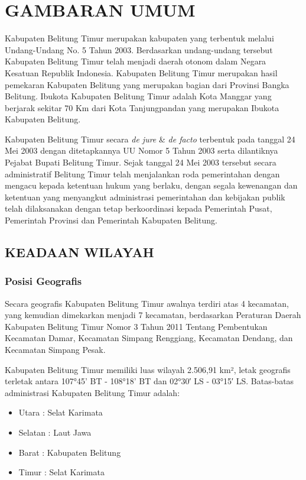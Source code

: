 \chapter{GAMBARAN UMUM}
Kabupaten Belitung Timur merupakan kabupaten yang terbentuk melalui Undang-Undang No. 5 Tahun 2003. Berdasarkan undang-undang tersebut Kabupaten Belitung Timur telah menjadi daerah otonom dalam Negara Kesatuan Republik Indonesia. Kabupaten Belitung Timur merupakan hasil pemekaran Kabupaten Belitung yang merupakan bagian dari Provinsi Bangka Belitung. Ibukota Kabupaten Belitung Timur adalah Kota Manggar yang berjarak sekitar 70 Km dari Kota Tanjungpandan yang merupakan Ibukota Kabupaten Belitung.

Kabupaten Belitung Timur secara \emph{de jure} \& \emph{de facto} terbentuk pada tanggal 24
Mei 2003 dengan ditetapkannya UU Nomor 5 Tahun 2003 serta dilantiknya
Pejabat Bupati Belitung Timur. Sejak tanggal 24 Mei 2003 tersebut
secara administratif Belitung Timur telah menjalankan roda pemerintahan
dengan mengacu kepada ketentuan hukum yang berlaku, dengan segala
kewenangan dan ketentuan yang menyangkut administrasi pemerintahan
dan kebijakan publik telah dilaksanakan dengan tetap berkoordinasi
kepada Pemerintah Pusat, Pemerintah Provinsi dan Pemerintah Kabupaten
Belitung.

\section{KEADAAN WILAYAH}

\subsection{Posisi Geografis}

Secara geografis Kabupaten Belitung Timur awalnya terdiri atas 4 kecamatan,
yang kemudian dimekarkan menjadi 7 kecamatan, berdasarkan Peraturan
Daerah Kabupaten Belitung Timur Nomor 3 Tahun 2011 Tentang Pembentukan
Kecamatan Damar, Kecamatan Simpang Renggiang, Kecamatan Dendang, dan
Kecamatan Simpang Pesak.

Kabupaten Belitung Timur memiliki luas wilayah 2.506,91 km², letak
geografis terletak antara 107°45' BT - 108°18' BT dan 02°30′ LS -
03°15′ LS. Batas-batas administrasi Kabupaten Belitung Timur adalah:
\begin{itemize}
	\item Utara : Selat Karimata
	\item Selatan : Laut Jawa
	\item Barat : Kabupaten Belitung
	\item Timur : Selat Karimata
\end{itemize}

